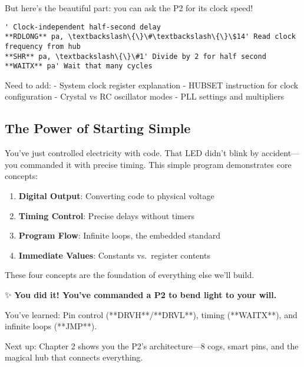 \documentclass[11pt]{book}
\providecommand{\tightlist}{%
  \setlength{\itemsep}{0pt}\setlength{\parskip}{0pt}}
\begin{document}
But here's the beautiful part: you can ask the P2 for its clock speed!

\begin{lstlisting}
' Clock-independent half-second delay
**RDLONG** pa, \textbackslash\{\}\#\textbackslash\{\}\$14' Read clock frequency from hub
**SHR** pa, \textbackslash\{\}\#1' Divide by 2 for half second
**WAITX** pa' Wait that many cycles
\end{lstlisting}

\begin{missing}
Need to add:
- System clock register explanation
- HUBSET instruction for clock configuration  
- Crystal vs RC oscillator modes
- PLL settings and multipliers
\end{missing}

\hypertarget{the-power-of-starting-simple}{%
\subsection{The Power of Starting
Simple}\label{the-power-of-starting-simple}}

You've just controlled electricity with code. That LED didn't blink by
accident---you commanded it with precise timing. This simple program
demonstrates core concepts:

\begin{enumerate}
\def\labelenumi{\arabic{enumi}.}
\tightlist
\item
  \textbf{Digital Output}: Converting code to physical voltage
\item
  \textbf{Timing Control}: Precise delays without timers
\item
  \textbf{Program Flow}: Infinite loops, the embedded standard
\item
  \textbf{Immediate Values}: Constants vs.~register contents
\end{enumerate}

These four concepts are the foundation of everything else we'll build.

\begin{chapterend}
✨ \textbf{You did it! You've commanded a P2 to bend light to your will.}

You've learned: Pin control (**DRVH**/**DRVL**), timing (**WAITX**), and infinite loops (**JMP**).

\chapterseparator

Next up: Chapter 2 shows you the P2's architecture—8 cogs, smart pins, and the magical hub that connects everything.
\end{chapterend}
\end{document}
